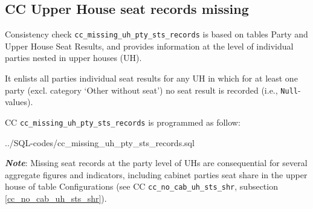 \subsection{CC Upper House seat records missing}\label{cc_missing_uh_pty_sts_records}
Consistency check \texttt{\footnotesize cc\_missing\_uh\_pty\_sts\_records} is based on tables Party and Upper House Seat Results, and provides information at the level of individual parties nested in upper houses (UH). 

It enlists all parties individual seat results for any UH in which for at least one party (excl. category `Other without seat') no seat result is recorded (i.e., \texttt{\footnotesize Null}-values).			

CC \texttt{\footnotesize cc\_missing\_uh\_pty\_sts\_records} is programmed as follow: 

%
{../SQL-codes/cc_missing_uh_pty_sts_records.sql}

{\em \bf Note}: Missing seat records at the party level of UHs are consequential for several aggregate figures and indicators, including cabinet parties seat share in the upper house of table Configurations (see CC \texttt{\footnotesize cc\_no\_cab\_uh\_sts\_shr}, subsection \ref{cc_no_cab_uh_sts_shr}).
